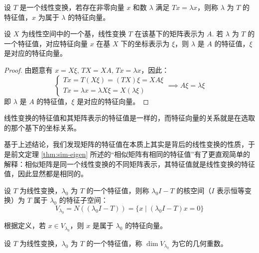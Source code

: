 \begin{definition}[线性变换的特征值与特征向量]
设 $T$ 是一个线性变换，若存在非零向量 $x$ 和数 $\lambda$ 满足 $Tx=\lambda x$，则称 $\lambda$ 为 $T$ 的特征值，$x$ 为属于 $\lambda$ 的特征向量。
\end{definition}

\begin{theorem}[线性变换的特征值和特征向量与矩阵的特征值和特征向量]
设 $X$ 为线性空间中的一个基，线性变换 $T$ 在该基下的矩阵表示为 $A$. 若 $\lambda$ 为 $T$ 的一个特征值，对应特征向量 $x$ 在基 $X$ 下的坐标表示为 $\xi$，则 $\lambda$ 是 $A$ 的特征值，$\xi$ 是对应的特征向量。
\end{theorem}
\begin{proof}
由题意有 $x=X\xi,\,TX=XA,\,Tx=\lambda x$，因此：
\[
    \begin{cases}
    Tx=T(X\xi)=(TX)\xi=XA\xi\\
    Tx=\lambda x=\lambda X\xi=X(\lambda\xi)
    \end{cases}\implies A\xi=\lambda\xi
\]
即 $\lambda$ 是 $A$ 的特征值，$\xi$ 是对应的特征向量。
\end{proof}

\begin{remark}
线性变换的特征值和其矩阵表示的特征值是一样的，而特征向量的关系就是在选取的那个基下的坐标关系。
\end{remark}

基于上述结论，我们发现矩阵的特征值在本质上其实是背后的线性变换的性质，于是前文定理 \ref{thm:sim-eigen} 所述的“相似矩阵有相同的特征值”有了更直观简单的解释：相似矩阵是同一个线性变换的不同矩阵表示，其特征值就是线性变换的特征值，因此显然都是相同的。

\begin{definition}[特征子空间]
设 $T$ 为线性变换，$\lambda_0$ 为 $T$ 的一个特征值，则称 $\lambda_0I-T$ 的核空间（$I$ 表示恒等变换）为 $T$ 属于 $\lambda_0$ 的特征子空间：
\[V_{\lambda_0}=N((\lambda_0I-T))=\{x\mid(\lambda_0 I-T)x=0\}\]
\end{definition}

\begin{com}
根据定义，若 $x\in V_{\lambda_0}$，则 $x$ 是属于 $\lambda_0$ 的特征向量。
\end{com}

\begin{definition}[几何重数]
设 $T$ 为线性变换，$\lambda_0$ 为 $T$ 的一个特征值，称 $\dim V_{\lambda_0}$ 为它的几何重数。
\end{definition}


